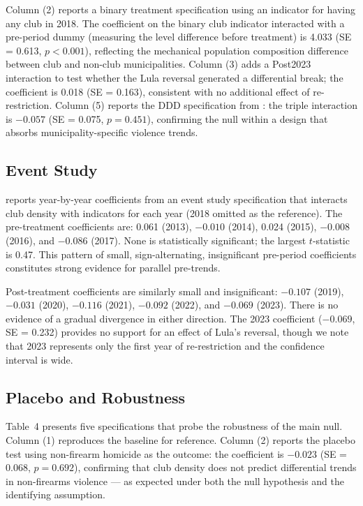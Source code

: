 \documentclass[12pt]{article}
\begin{document}
Column (2) reports a binary treatment specification using an indicator for having any club in 2018. The coefficient on the binary club indicator interacted with a pre-period dummy (measuring the level difference before treatment) is 4.033 (SE = 0.613, $p < 0.001$), reflecting the mechanical population composition difference between club and non-club municipalities. Column (3) adds a Post2023 interaction to test whether the Lula reversal generated a differential break; the coefficient is 0.018 (SE = 0.163), consistent with no additional effect of re-restriction. Column (5) reports the DDD specification from : the triple interaction is $-0.057$ (SE = 0.075, $p = 0.451$), confirming the null within a design that absorbs municipality-specific violence trends.

{\small}

\subsection{Event Study}

 reports year-by-year coefficients from an event study specification that interacts club density with indicators for each year (2018 omitted as the reference). The pre-treatment coefficients are: 0.061 (2013), $-0.010$ (2014), 0.024 (2015), $-0.008$ (2016), and $-0.086$ (2017). None is statistically significant; the largest $t$-statistic is 0.47. This pattern of small, sign-alternating, insignificant pre-period coefficients constitutes strong evidence for parallel pre-trends.

Post-treatment coefficients are similarly small and insignificant: $-0.107$ (2019), $-0.031$ (2020), $-0.116$ (2021), $-0.092$ (2022), and $-0.069$ (2023). There is no evidence of a gradual divergence in either direction. The 2023 coefficient ($-0.069$, SE = 0.232) provides no support for an effect of Lula's reversal, though we note that 2023 represents only the first year of re-restriction and the confidence interval is wide.



\subsection{Placebo and Robustness}

Table~4 presents five specifications that probe the robustness of the main null. Column (1) reproduces the baseline for reference. Column (2) reports the placebo test using non-firearm homicide as the outcome: the coefficient is $-0.023$ (SE = 0.068, $p = 0.692$), confirming that club density does not predict differential trends in non-firearms violence --- as expected under both the null hypothesis and the identifying assumption.
\end{document}
